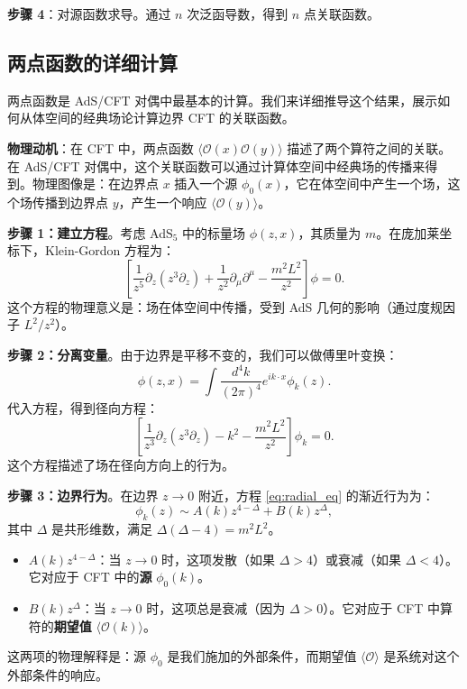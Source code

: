 \textbf{步骤 4}：对源函数求导。通过 $n$ 次泛函导数，得到 $n$ 点关联函数。

\subsection{两点函数的详细计算}

两点函数是 AdS/CFT 对偶中最基本的计算。我们来详细推导这个结果，展示如何从体空间的经典场论计算边界 CFT 的关联函数。

\textbf{物理动机}：在 CFT 中，两点函数 $\langle \mathcal{O}(x) \mathcal{O}(y) \rangle$ 描述了两个算符之间的关联。在 AdS/CFT 对偶中，这个关联函数可以通过计算体空间中经典场的传播来得到。物理图像是：在边界点 $x$ 插入一个源 $\phi_0(x)$，它在体空间中产生一个场，这个场传播到边界点 $y$，产生一个响应 $\langle \mathcal{O}(y) \rangle$。

\textbf{步骤 1：建立方程}。考虑 AdS$_5$ 中的标量场 $\phi(z, x)$，其质量为 $m$。在庞加莱坐标下，Klein-Gordon 方程为：
\begin{equation}
    \left[\frac{1}{z^5} \partial_z \left(z^3 \partial_z\right) + \frac{1}{z^2} \partial_\mu \partial^\mu - \frac{m^2 L^2}{z^2}\right] \phi = 0.
\end{equation}
这个方程的物理意义是：场在体空间中传播，受到 AdS 几何的影响（通过度规因子 $L^2/z^2$）。

\textbf{步骤 2：分离变量}。由于边界是平移不变的，我们可以做傅里叶变换：
\begin{equation}
    \phi(z, x) = \int \frac{d^4 k}{(2\pi)^4} e^{ik \cdot x} \phi_k(z).
\end{equation}
代入方程，得到径向方程：
\begin{equation}
    \left[\frac{1}{z^3} \partial_z \left(z^3 \partial_z\right) - k^2 - \frac{m^2 L^2}{z^2}\right] \phi_k = 0.
    \label{eq:radial_eq}
\end{equation}
这个方程描述了场在径向方向上的行为。

\textbf{步骤 3：边界行为}。在边界 $z \to 0$ 附近，方程 \eqref{eq:radial_eq} 的渐近行为为：
\begin{equation}
    \phi_k(z) \sim A(k) z^{4-\Delta} + B(k) z^\Delta,
\end{equation}
其中 $\Delta$ 是共形维数，满足 $\Delta(\Delta - 4) = m^2 L^2$。

\begin{note}[边界行为的物理意义]
\begin{itemize}
    \item $A(k) z^{4-\Delta}$：当 $z \to 0$ 时，这项发散（如果 $\Delta > 4$）或衰减（如果 $\Delta < 4$）。它对应于 CFT 中的\textbf{源} $\phi_0(k)$。
    \item $B(k) z^\Delta$：当 $z \to 0$ 时，这项总是衰减（因为 $\Delta > 0$）。它对应于 CFT 中算符的\textbf{期望值} $\langle \mathcal{O}(k) \rangle$。
\end{itemize}
这两项的物理解释是：源 $\phi_0$ 是我们施加的外部条件，而期望值 $\langle \mathcal{O} \rangle$ 是系统对这个外部条件的响应。
\end{note}

